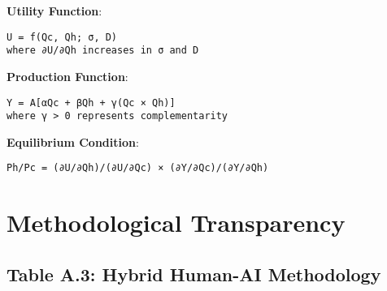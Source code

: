 \documentclass[
  a4paper,
]{report}
\begin{document}
\textbf{Utility Function}:

\begin{verbatim}
U = f(Qc, Qh; σ, D)
where ∂U/∂Qh increases in σ and D
\end{verbatim}

\textbf{Production Function}:

\begin{verbatim}
Y = A[αQc + βQh + γ(Qc × Qh)]
where γ > 0 represents complementarity
\end{verbatim}

\textbf{Equilibrium Condition}:

\begin{verbatim}
Ph/Pc = (∂U/∂Qh)/(∂U/∂Qc) × (∂Y/∂Qc)/(∂Y/∂Qh)
\end{verbatim}

\section{Methodological Transparency}\label{methodological-transparency}

\subsection{Table A.3: Hybrid Human-AI
Methodology}\label{table-a.3-hybrid-human-ai-methodology}
\end{document}
